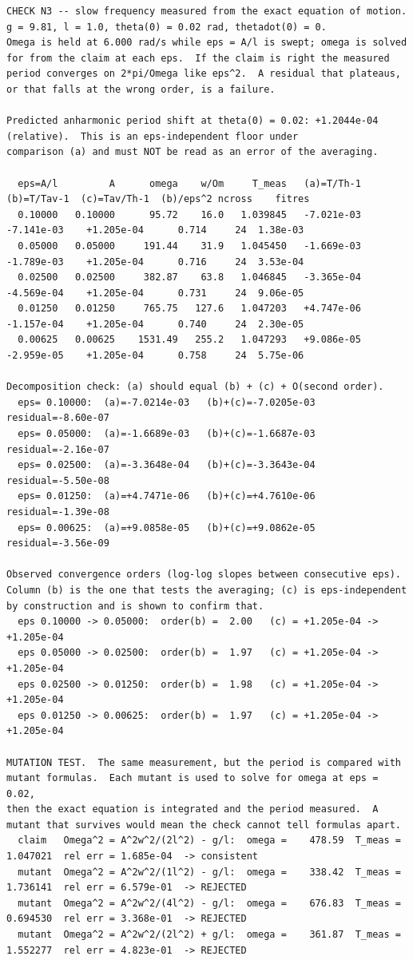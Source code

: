 \documentclass[11pt,a4paper]{article}
\begin{document}
\begin{lstlisting}
CHECK N3 -- slow frequency measured from the exact equation of motion.
g = 9.81, l = 1.0, theta(0) = 0.02 rad, thetadot(0) = 0.
Omega is held at 6.000 rad/s while eps = A/l is swept; omega is solved
for from the claim at each eps.  If the claim is right the measured
period converges on 2*pi/Omega like eps^2.  A residual that plateaus,
or that falls at the wrong order, is a failure.

Predicted anharmonic period shift at theta(0) = 0.02: +1.2044e-04 (relative).  This is an eps-independent floor under
comparison (a) and must NOT be read as an error of the averaging.

  eps=A/l         A      omega    w/Om     T_meas   (a)=T/Th-1   (b)=T/Tav-1  (c)=Tav/Th-1  (b)/eps^2 ncross    fitres
  0.10000   0.10000      95.72    16.0   1.039845   -7.021e-03    -7.141e-03    +1.205e-04      0.714     24  1.38e-03
  0.05000   0.05000     191.44    31.9   1.045450   -1.669e-03    -1.789e-03    +1.205e-04      0.716     24  3.53e-04
  0.02500   0.02500     382.87    63.8   1.046845   -3.365e-04    -4.569e-04    +1.205e-04      0.731     24  9.06e-05
  0.01250   0.01250     765.75   127.6   1.047203   +4.747e-06    -1.157e-04    +1.205e-04      0.740     24  2.30e-05
  0.00625   0.00625    1531.49   255.2   1.047293   +9.086e-05    -2.959e-05    +1.205e-04      0.758     24  5.75e-06

Decomposition check: (a) should equal (b) + (c) + O(second order).
  eps= 0.10000:  (a)=-7.0214e-03   (b)+(c)=-7.0205e-03   residual=-8.60e-07
  eps= 0.05000:  (a)=-1.6689e-03   (b)+(c)=-1.6687e-03   residual=-2.16e-07
  eps= 0.02500:  (a)=-3.3648e-04   (b)+(c)=-3.3643e-04   residual=-5.50e-08
  eps= 0.01250:  (a)=+4.7471e-06   (b)+(c)=+4.7610e-06   residual=-1.39e-08
  eps= 0.00625:  (a)=+9.0858e-05   (b)+(c)=+9.0862e-05   residual=-3.56e-09

Observed convergence orders (log-log slopes between consecutive eps).
Column (b) is the one that tests the averaging; (c) is eps-independent
by construction and is shown to confirm that.
  eps 0.10000 -> 0.05000:  order(b) =  2.00   (c) = +1.205e-04 -> +1.205e-04
  eps 0.05000 -> 0.02500:  order(b) =  1.97   (c) = +1.205e-04 -> +1.205e-04
  eps 0.02500 -> 0.01250:  order(b) =  1.98   (c) = +1.205e-04 -> +1.205e-04
  eps 0.01250 -> 0.00625:  order(b) =  1.97   (c) = +1.205e-04 -> +1.205e-04

MUTATION TEST.  The same measurement, but the period is compared with
mutant formulas.  Each mutant is used to solve for omega at eps = 0.02,
then the exact equation is integrated and the period measured.  A
mutant that survives would mean the check cannot tell formulas apart.
  claim   Omega^2 = A^2w^2/(2l^2) - g/l:  omega =    478.59  T_meas =  1.047021  rel err = 1.685e-04  -> consistent
  mutant  Omega^2 = A^2w^2/(1l^2) - g/l:  omega =    338.42  T_meas =  1.736141  rel err = 6.579e-01  -> REJECTED
  mutant  Omega^2 = A^2w^2/(4l^2) - g/l:  omega =    676.83  T_meas =  0.694530  rel err = 3.368e-01  -> REJECTED
  mutant  Omega^2 = A^2w^2/(2l^2) + g/l:  omega =    361.87  T_meas =  1.552277  rel err = 4.823e-01  -> REJECTED
\end{lstlisting}
\end{document}
